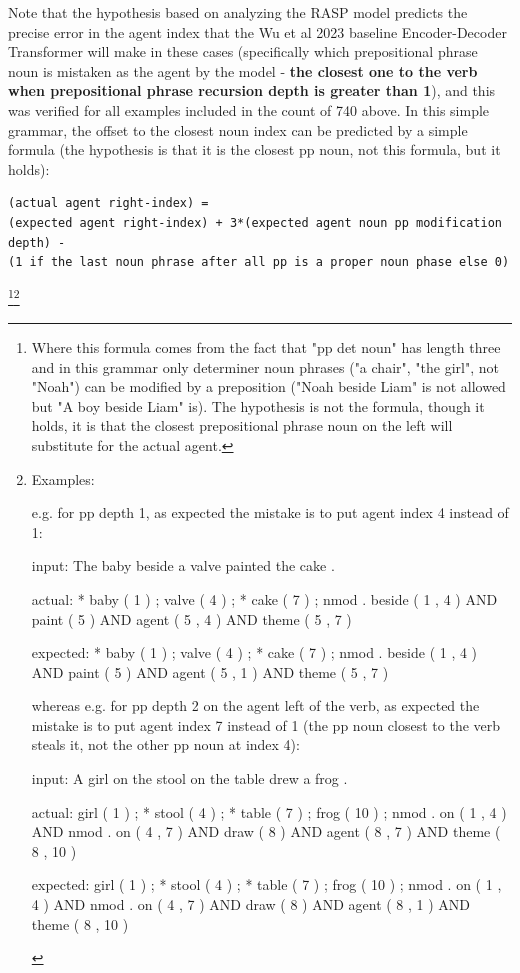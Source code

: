 \documentclass[11pt]{article}
\begin{document}
Note that the hypothesis based on analyzing the RASP model predicts the precise error in the agent index that the Wu et al 2023 baseline Encoder-Decoder Transformer will make in these cases (specifically which prepositional phrase noun is mistaken as the agent by the model - \textbf{the closest one to the verb when prepositional phrase recursion depth is greater than 1}), and this was verified for all examples included in the count of 740 above.
In this simple grammar, the offset to the closest noun index can be predicted by a simple formula (the hypothesis is that it is the closest pp noun, not this formula, but it holds):
\begin{tiny}
\begin{verbatim}
(actual agent right-index) = 
(expected agent right-index) + 3*(expected agent noun pp modification depth) - 
(1 if the last noun phrase after all pp is a proper noun phase else 0)
\end{verbatim}
\end{tiny}
\footnote{Where this formula comes from the fact that "pp det noun" has length three and in this grammar only determiner noun phrases ("a chair", "the girl", not "Noah") can be modified by a preposition ("Noah beside Liam" is not allowed but "A boy beside Liam" is). The hypothesis is not the formula, though it holds, it is that the closest prepositional phrase noun on the left will substitute for the actual agent.}\footnote{
Examples:
\begin{tiny}

e.g. for pp depth 1, as expected the mistake is to put agent index 4 instead of 1:

input: The baby beside a valve painted the cake .

actual:   * baby ( 1 ) ; valve ( 4 ) ; * cake ( 7 ) ; nmod . beside ( 1 , 4 ) AND paint ( 5 ) AND agent ( 5 , 4 ) AND theme ( 5 , 7 )

expected: * baby ( 1 ) ; valve ( 4 ) ; * cake ( 7 ) ; nmod . beside ( 1 , 4 ) AND paint ( 5 ) AND agent ( 5 , 1 ) AND theme ( 5 , 7 )


whereas e.g. for pp depth 2 on the agent left of the verb, as expected the mistake is to put agent index 7 instead of 1 (the pp noun closest to the verb steals it, not the other pp noun at index 4):

input: A girl on the stool on the table drew a frog .

actual:   girl ( 1 ) ; * stool ( 4 ) ; * table ( 7 ) ; frog ( 10 ) ; nmod . on ( 1 , 4 ) AND nmod . on ( 4 , 7 ) AND draw ( 8 ) AND agent ( 8 , 7 ) AND theme ( 8 , 10 )

expected: girl ( 1 ) ; * stool ( 4 ) ; * table ( 7 ) ; frog ( 10 ) ; nmod . on ( 1 , 4 ) AND nmod . on ( 4 , 7 ) AND draw ( 8 ) AND agent ( 8 , 1 ) AND theme ( 8 , 10 )

\end{tiny}
}
\end{document}
